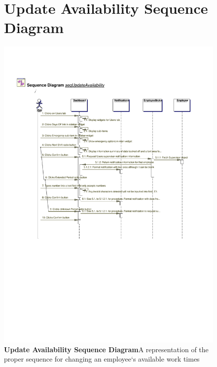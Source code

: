 \documentclass[letterpaper,12pt]{report}
\begin{document}
\begin{figure}[hbp]
 \section{Update Availability Sequence Diagram}
 \includegraphics[scale=0.65]{externals/SequenceDiagrams15.pdf}
 \caption{\small
\textbf{Update Availability Sequence Diagram}\newline A representation of the proper sequence for changing an employee`s available work times}\label{fig:seqUpdateAvail}
\end{figure}
\newpage
\end{document}
